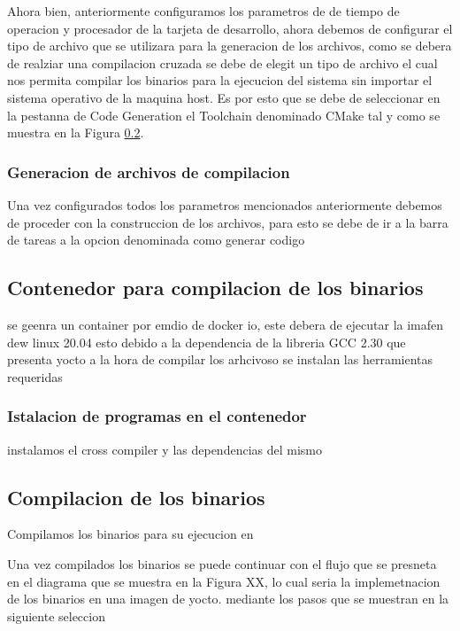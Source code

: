 Ahora bien, anteriormente configuramos los parametros de de tiempo de operacion y procesador de la tarjeta de desarrollo, ahora debemos de configurar el tipo de archivo que se utilizara para la generacion de los archivos, como se debera de realziar una compilacion cruzada se debe de elegit un tipo de archivo el cual nos permita compilar los binarios para la ejecucion del sistema sin importar el sistema operativo de la maquina host. Es por esto que se debe de seleccionar en la pestanna de Code Generation el Toolchain denominado CMake tal y como se muestra en la Figura \ref{}.


\subsubsection{Generacion de archivos de compilacion}

Una vez configurados todos los parametros mencionados anteriormente debemos de proceder con la construccion de los archivos, para esto se debe de ir a la barra de tareas a la opcion denominada como generar codigo

\subsection{Contenedor para compilacion de los binarios}

se geenra un container por emdio de docker io, este debera de ejecutar la imafen dew linux 20.04 esto debido a la dependencia de la libreria GCC 2.30 que presenta yocto a la hora de compilar los arhcivoso
se instalan las herramientas requeridas

\subsubsection{Istalacion de programas en el contenedor}

instalamos el cross compiler y las dependencias del mismo

\subsection{Compilacion de los binarios}

Compilamos los binarios para su ejecucion en

Una vez compilados los binarios se puede continuar con el flujo que se presneta en el diagrama que se muestra en la Figura XX, lo cual seria la implemetnacion de los binarios en una imagen de yocto. mediante los pasos que se muestran en la siguiente seleccion


